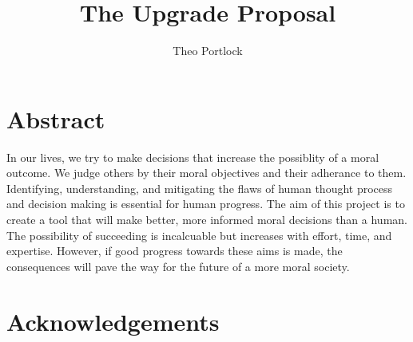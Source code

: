 \documentclass{book}
\title{The Upgrade Proposal}
\author{Theo Portlock}
\begin{document}
\frontmatter
\maketitle

\chapter{Abstract}
In our lives, we try to make decisions that increase the possiblity of a moral outcome.
We judge others by their moral objectives and their adherance to them.
Identifying, understanding, and mitigating the flaws of human thought process and decision making is essential for human progress.
The aim of this project is to create a tool that will make better, more informed moral decisions than a human.
The possibility of succeeding is incalcuable but increases with effort, time, and expertise.
However, if good progress towards these aims is made, the consequences will pave the way for the future of a more moral society.

\cleardoublepage
{}
{}
\tableofcontents

\cleardoublepage
{}
{}
\listoffigures

\cleardoublepage
{}
{}
\listoftables

\mainmatter








\backmatter


\chapter{Acknowledgements}


\end{document}
